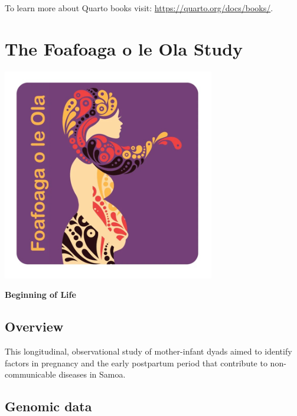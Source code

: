 \documentclass[
  letterpaper,
  DIV=11,
  numbers=noendperiod]{scrreprt}
\begin{document}

To learn more about Quarto books visit:
\url{https://quarto.org/docs/books/}.


\chapter*{The Foafoaga o le Ola
Study}\label{the-foafoaga-o-le-ola-study}


\begin{center}
\includegraphics[width=3.64583in,height=\textheight]{f.png}
\end{center}

\textbf{Beginning of Life}

\section*{Overview}\label{overview}


This longitudinal, observational study of mother-infant dyads aimed to
identify factors in pregnancy and the early postpartum period that
contribute to non-communicable diseases in Samoa.

\section*{Genomic data}\label{genomic-data}
\end{document}
